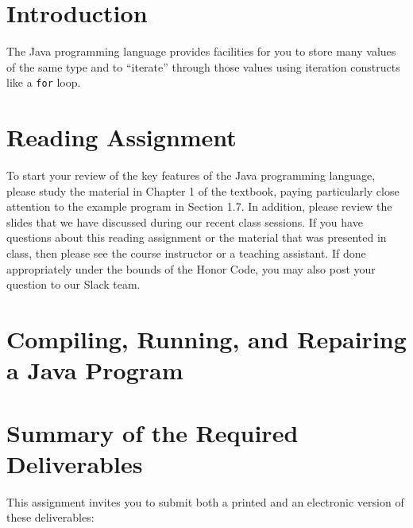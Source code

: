 

\usepackage[compact]{titlesec}



\section*{Introduction}

The Java programming language provides facilities for you to store many values of the same type and to ``iterate''
through those values using iteration constructs like a {\tt for} loop.

\section*{Reading Assignment}

To start your review of the key features of the Java programming language, please study the material in Chapter 1 of
the textbook, paying particularly close attention to the example program in Section 1.7. In addition, please review the
slides that we have discussed during our recent class sessions. If you have questions about this reading assignment or
the material that was presented in class, then please see the course instructor or a teaching assistant. If done
appropriately under the bounds of the Honor Code, you may also post your question to our Slack team.

\section*{Compiling, Running, and Repairing a Java Program}



\section*{Summary of the Required Deliverables}

This assignment invites you to submit both a printed and an electronic version of these deliverables:

